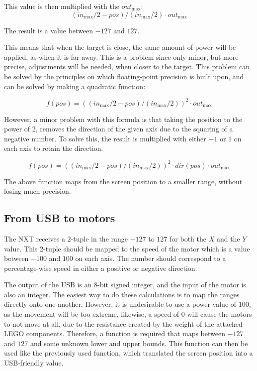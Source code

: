 This value is then multiplied with the $out_\text{max}$:
$$
(in_\text{max}/2 - pos)/(in_\text{max}/2) \cdot out_\text{max}
$$

The result is a value between $-127$ and $127$.

This means that when the target is close, the same amount of power will be applied, as when it is far away.
This is a problem since only minor, but more precise, adjustments will be needed, when closer to the target.
This problem can be solved by the principles on which floating-point precision is built upon, and can be solved by making a quadratic function:

$$
f(pos) = ((in_\text{max}/2 - pos)/(in_\text{max}/2))^2 \cdot out_\text{max}
$$

However, a minor problem with this formula is that taking the position to the power of 2, removes the direction of the given axis due to the squaring of a negative number.
To solve this, the result is multiplied with either $-1$ or $1$ on each axis to retain the direction.

$$
f(pos) = ((in_\text{max}/2 - pos)/(in_\text{max}/2))^2 \cdot dir(pos) \cdot out_\text{max}
$$

The above function maps from the screen position to a smaller range, without losing much precision.

\subsection{From USB to motors}
The NXT receives a 2-tuple in the range $-127$ to $127$ for both the $X$ and the $Y$ value.
This 2-tuple should be mapped to the speed of the motor which is a value between $-100$ and $100$ on each axis.
The number should correspond to a percentage-wise speed in either a positive or negative direction.

The output of the USB is an 8-bit signed integer, and the input of the motor is also an integer.
The easiest way to do these calculations is to map the ranges directly onto one another.
However, it is undesirable to use a power value of 100, as the movement will be too extreme, likewise, a speed of 0 will cause the motors to not move at all, due to the resistance created by the weight of the attached LEGO components.
Therefore, a function is required that maps between $-127$ and $127$ and some unknown lower and upper bounds.
This function can then be used like the previously used function, which translated the screen position into a USB-friendly value.


